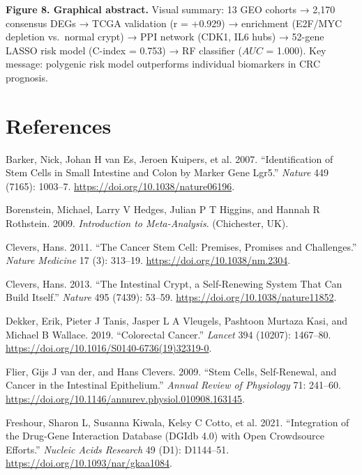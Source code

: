 \documentclass[
  12pt,
]{article}
\newlength{\cslhangindent}
\newenvironment{CSLReferences}[2] %
 {\begin{list}{}{%
  \setlength{\itemindent}{0pt}
  \setlength{\leftmargin}{0pt}
  \setlength{\parsep}{0pt}
  \ifodd #1
   \setlength{\leftmargin}{\cslhangindent}
   \setlength{\itemindent}{-1\cslhangindent}
  \fi
  \setlength{\itemsep}{#2\baselineskip}}}
 {\end{list}}
\begin{document}
\textbf{Figure 8. Graphical abstract.} Visual summary: 13 GEO cohorts →
2,170 consensus DEGs → TCGA validation (r = +0.929) → enrichment
(E2F/MYC depletion vs.~normal crypt) → PPI network (CDK1, IL6 hubs) →
52-gene LASSO risk model (C-index = 0.753) → RF classifier (\(AUC\) =
1.000). Key message: polygenic risk model outperforms individual
biomarkers in CRC prognosis.

\section{References}\label{references}

\protect{}\label{refs}
\begin{CSLReferences}{1}{1}
Barker, Nick, Johan H van Es, Jeroen Kuipers, et al. 2007.
{``Identification of Stem Cells in Small Intestine and Colon by Marker
Gene {Lgr5}.''} \emph{Nature} 449 (7165): 1003--7.
\url{https://doi.org/10.1038/nature06196}.

Borenstein, Michael, Larry V Hedges, Julian P T Higgins, and Hannah R
Rothstein. 2009. \emph{Introduction to Meta-Analysis}. (Chichester, UK).

Clevers, Hans. 2011. {``The Cancer Stem Cell: Premises, Promises and
Challenges.''} \emph{Nature Medicine} 17 (3): 313--19.
\url{https://doi.org/10.1038/nm.2304}.

Clevers, Hans. 2013. {``The Intestinal Crypt, a Self-Renewing System
That Can Build Itself.''} \emph{Nature} 495 (7439): 53--59.
\url{https://doi.org/10.1038/nature11852}.

Dekker, Erik, Pieter J Tanis, Jasper L A Vleugels, Pashtoon Murtaza
Kasi, and Michael B Wallace. 2019. {``Colorectal Cancer.''}
\emph{Lancet} 394 (10207): 1467--80.
\url{https://doi.org/10.1016/S0140-6736(19)32319-0}.

Flier, Gijs J van der, and Hans Clevers. 2009. {``Stem Cells,
Self-Renewal, and Cancer in the Intestinal Epithelium.''} \emph{Annual
Review of Physiology} 71: 241--60.
\url{https://doi.org/10.1146/annurev.physiol.010908.163145}.

Freshour, Sharon L, Susanna Kiwala, Kelsy C Cotto, et al. 2021.
{``Integration of the Drug-Gene Interaction Database ({DGIdb} 4.0) with
Open Crowdsource Efforts.''} \emph{Nucleic Acids Research} 49 (D1):
D1144--51. \url{https://doi.org/10.1093/nar/gkaa1084}.


\end{CSLReferences}
\end{document}
